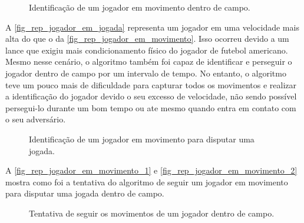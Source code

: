 \clearpage

\begin{figure}[ht]
	\caption{\label{fig_rep_jogador_em_movimento}Identificação de um jogador em movimento dentro de campo.}
	\begin{center}
	\end{center}
	\centering {}
\end{figure}

A \autoref{fig_rep_jogador_em_jogada} representa um jogador em uma velocidade mais alta do que o da \autoref{fig_rep_jogador_em_movimento}. Isso ocorreu devido a um lance que exigiu mais condicionamento físico do jogador de futebol americano. Mesmo nesse cenário, o algoritmo também foi capaz de identificar e perseguir o jogador dentro de campo por um intervalo de tempo. No entanto, o algoritmo teve um pouco mais de dificuldade para capturar todos os movimentos e realizar a identificação do  jogador devido o seu excesso de velocidade, não sendo possível persegui-lo durante um bom tempo ou ate mesmo quando entra em contato com o seu adversário.

\begin{figure}[ht]
	\caption{\label{fig_rep_jogador_em_jogada}Identificação de um jogador em movimento para disputar uma jogada.}
	\begin{center}
	\end{center}
	\centering {}
\end{figure}

A \autoref{fig_rep_jogador_em_movimento_1} e \autoref{fig_rep_jogador_em_movimento_2} mostra como foi a tentativa do algoritmo de seguir um jogador em movimento para disputar uma jogada dentro de campo.

\begin{figure}[ht]
	\caption{\label{fig_rep_jogador_em_movimento_1}Tentativa de seguir os movimentos de um jogador dentro de campo.}
	\begin{center}
	\end{center}
	\centering {}
\end{figure}

